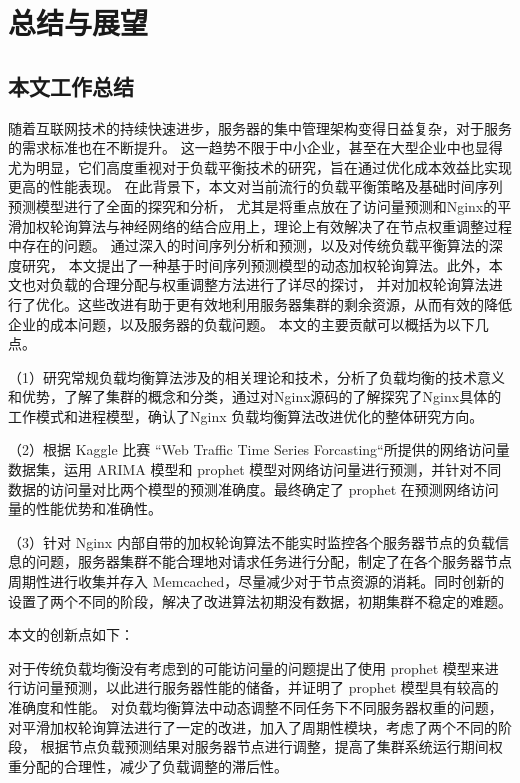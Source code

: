 \chapter{总结与展望}

\section{本文工作总结}

随着互联网技术的持续快速进步，服务器的集中管理架构变得日益复杂，对于服务的需求标准也在不断提升。
这一趋势不限于中小企业，甚至在大型企业中也显得尤为明显，它们高度重视对于负载平衡技术的研究，旨在通过优化成本效益比实现更高的性能表现。
在此背景下，本文对当前流行的负载平衡策略及基础时间序列预测模型进行了全面的探究和分析，
尤其是将重点放在了访问量预测和Nginx的平滑加权轮询算法与神经网络的结合应用上，理论上有效解决了在节点权重调整过程中存在的问题。
通过深入的时间序列分析和预测，以及对传统负载平衡算法的深度研究，
本文提出了一种基于时间序列预测模型的动态加权轮询算法。此外，本文也对负载的合理分配与权重调整方法进行了详尽的探讨，
并对加权轮询算法进行了优化。这些改进有助于更有效地利用服务器集群的剩余资源，从而有效的降低企业的成本问题，以及服务器的负载问题。
本文的主要贡献可以概括为以下几点。

（1）研究常规负载均衡算法涉及的相关理论和技术，分析了负载均衡的技术意义和优势，了解了集群的概念和分类，通过对Nginx源码的了解探究了Nginx具体的工作模式和进程模型，确认了Nginx 负载均衡算法改进优化的整体研究方向。

（2）根据 Kaggle 比赛 “Web Traffic Time Series Forcasting“所提供的网络访问量数据集，运用 ARIMA 模型和 prophet 模型对网络访问量进行预测，并针对不同数据的访问量对比两个模型的预测准确度。最终确定了 prophet 在预测网络访问量的性能优势和准确性。

（3）针对 Nginx 内部自带的加权轮询算法不能实时监控各个服务器节点的负载信息的问题，服务器集群不能合理地对请求任务进行分配，制定了在各个服务器节点周期性进行收集并存入 Memcached，尽量减少对于节点资源的消耗。同时创新的设置了两个不同的阶段，解决了改进算法初期没有数据，初期集群不稳定的难题。

本文的创新点如下：

对于传统负载均衡没有考虑到的可能访问量的问题提出了使用 prophet 模型来进行访问量预测，以此进行服务器性能的储备，并证明了 prophet 模型具有较高的准确度和性能。
对负载均衡算法中动态调整不同任务下不同服务器权重的问题，对平滑加权轮询算法进行了一定的改进，加入了周期性模块，考虑了两个不同的阶段，
根据节点负载预测结果对服务器节点进行调整，提高了集群系统运行期间权重分配的合理性，减少了负载调整的滞后性。

